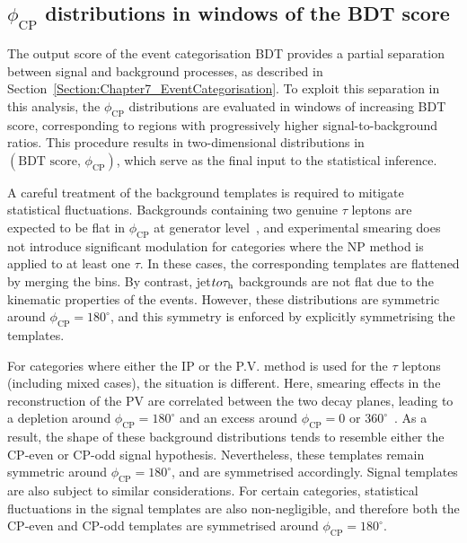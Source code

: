 \subsection{\texorpdfstring{$\phi_\text{CP}$}{phicp} distributions in windows of the BDT score}

The output score of the event categorisation BDT provides a partial separation between signal and background processes, as described in Section~\ref{Section:Chapter7_EventCategorisation}. 
To exploit this separation in this analysis, the $\phi_{\mathrm{CP}}$ distributions are evaluated in windows of increasing BDT score, corresponding to regions with progressively higher signal-to-background ratios. 
This procedure results in two-dimensional distributions in $(\text{BDT score},\,\phi_{\mathrm{CP}})$, which serve as the final input to the statistical inference.  

A careful treatment of the background templates is required to mitigate statistical fluctuations. Backgrounds containing two genuine $\tau$ leptons are expected to be flat in $\phi_{\mathrm{CP}}$ at generator level~\cite{Berge:2014sra}, and experimental smearing does not introduce significant modulation for categories where the \ac{NP} method is applied to at least one $\tau$. In these cases, the corresponding templates are flattened by merging the bins. By contrast, jet$to\tau_\mathrm{h}$ backgrounds are not flat due to the kinematic properties of the events. However, these distributions are symmetric around $\phi_{\mathrm{CP}} = 180^\circ$, and this symmetry is enforced by explicitly symmetrising the templates.

For categories where either the \ac{IP} or the \ac{P.V.} method is used for the $\tau$ leptons (including mixed cases), the situation is different. Here, smearing effects in the reconstruction of the \ac{PV} are correlated between the two decay planes, leading to a depletion around $\phi_{\mathrm{CP}} = 180^\circ$ and an excess around $\phi_{\mathrm{CP}} = 0 \,\,\text{or}\,\,360^\circ$~\cite{Berge:2014sra}. 
As a result, the shape of these background distributions tends to resemble either the CP-even or CP-odd signal hypothesis. 
Nevertheless, these templates remain symmetric around $\phi_{\mathrm{CP}} = 180^\circ$, and are symmetrised accordingly. Signal templates are also subject to similar considerations. 
For certain categories, statistical fluctuations in the signal templates are also non-negligible, and therefore both the CP-even and CP-odd templates are symmetrised around $\phi_{\mathrm{CP}} = 180^\circ$. 

